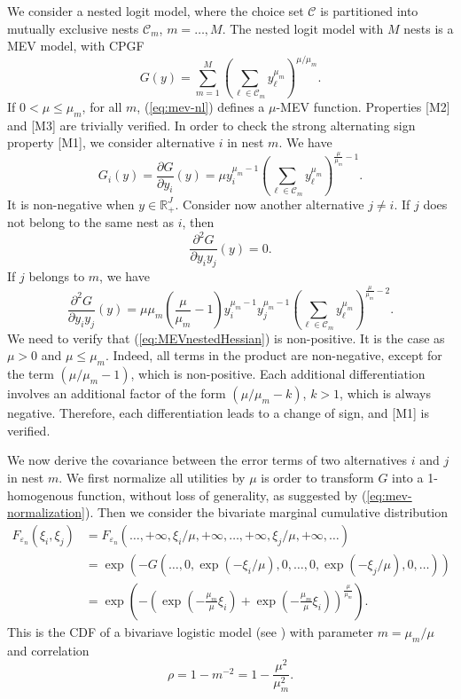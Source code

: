 \documentclass[12pt,a4paper]{article}
\newcommand{\req}[1]{(\ref{#1})}
\newcommand{\C}{\mathcal{C}}
\newcommand{\R}{\mathbb{R}}
\begin{document}
We consider a nested logit model, where the choice set $\C$ is partitioned into
mutually exclusive nests $\C_m$, $m=\ldots, M$.
The nested logit model with $M$ nests is  a MEV model, with CPGF 
\begin{equation}
\label{eq:mev-nl}
G(y)= \sum_{m=1}^M \left( \sum_{\ell \in \C_m} y_\ell^{\mu_m} \right)^{\mu/\mu_m}.
\end{equation}
If $0 < \mu \leq \mu_m$, for all $m$, \req{eq:mev-nl} defines  a $\mu$-MEV function. Properties [M2] and [M3] are trivially verified.  In order to  check the strong alternating sign property [M1], we consider alternative $i$ in nest $m$. We have
\begin{equation}
\label{eq:gi-nl}
G_i(y) = \frac{\partial G}{\partial y_i}(y) = \mu y_i^{{\mu_{m}} - 1} \left(\sum_{\ell \in \C_m} y_\ell^{\mu_{m}}\right)^{\frac{\mu}{\mu_{m}}-1}.
\end{equation}
It is non-negative when $y\in\R^J_+$. Consider now another alternative $j\neq i$. If $j$ does not belong to the same nest as $i$, then
\begin{equation}
\label{eq:MEVnestedHessian2}
\frac{\partial^2 G}{\partial y_i y_j}(y) = 0.
\end{equation}
If $j$ belongs to $m$, we have
\begin{equation}
\label{eq:MEVnestedHessian}
\frac{\partial^2 G}{\partial y_i y_j}(y) = \mu \mu_m (\frac{\mu}{\mu_{m}}-1 )y_i^{{\mu_{m}} -1}y_j^{{\mu_{m}} -1}
\left(\sum_{\ell\in \C_m} y_\ell^{\mu_m}\right)^{\frac{\mu}{\mu_m}-2}.
\end{equation}
We need to verify that \req{eq:MEVnestedHessian} is non-positive. It is the case as $\mu > 0$ and $\mu \leq \mu_m$. Indeed, all terms in the product are
non-negative, except for the term $(\mu/\mu_m-1)$, which is
non-positive.  Each additional differentiation  involves an additional factor of the form $(\mu/\mu_m - k)$,  $k>1$, which is always negative. Therefore, each differentiation leads to a change of sign, and [M1] is verified.

We now derive the covariance between the error terms of two alternatives $i$ and $j$ in nest $m$. We first
normalize all utilities by $\mu$ is order to transform $G$ into a
1-homogenous function, without loss of generality, as suggested by \req{eq:mev-normalization}. Then we consider the bivariate marginal cumulative distribution 
\begin{align*}
F_{\varepsilon_n} (\xi_i,\xi_j) &= F_{\varepsilon_n}(\ldots,+\infty, \xi_i/\mu,+\infty,\ldots,+\infty,\xi_j/\mu,+\infty,\ldots)  \\
&= \exp\left(-G(\ldots,0, \exp(-\xi_i/\mu),0,\ldots,0,\exp(-\xi_j/\mu),0,\ldots)\right)  \\
&= \exp\left(-\left(\exp(-\frac{\mu_m}{\mu}\xi_i) + \exp(-\frac{\mu_m}{\mu}\xi_i) \right)^\frac{\mu}{\mu_m}\right).
\end{align*}
This is the CDF of a bivariave logistic model (see \cite[p. 628]{KotzBalaJohn2000}) with parameter $m=\mu_m/\mu$ and correlation
\begin{equation}
\rho = 1-m^{-2} = 1-\frac{\mu^2}{\mu_m^2}.
\end{equation}
\end{document}
